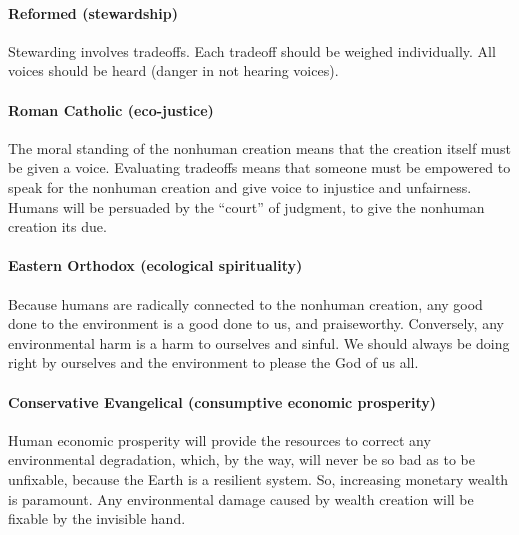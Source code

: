 \documentclass[12pt]{article}
\begin{document}
\paragraph{Reformed (stewardship)} 

Stewarding involves tradeoffs.  %
Each tradeoff should be weighed individually. %
All voices should be heard (danger in not hearing voices). %

\paragraph{Roman Catholic (eco-justice)} 

The moral standing of the nonhuman creation means that 
the creation itself must be given a voice. 
Evaluating tradeoffs means that someone must be empowered 
to speak for the nonhuman creation and 
give voice to injustice and unfairness. 
Humans will be persuaded by the “court” of judgment, 
to give the nonhuman creation its due.

\paragraph{Eastern Orthodox (ecological spirituality)} 

Because humans are radically connected to the nonhuman creation, 
any good done to the environment is a good done to us, 
and praiseworthy. 
Conversely, any environmental harm is a harm to ourselves and sinful. 
We should always be doing right by ourselves and the environment 
to please the God of us all.

\paragraph{Conservative Evangelical (consumptive economic prosperity)} 

Human economic prosperity will provide the resources 
to correct any environmental degradation, which, 
by the way, will never be so bad as to be unfixable, 
because the Earth is a resilient system. 
So, increasing monetary wealth is paramount. 
Any environmental damage caused by wealth creation will be fixable by the invisible hand. 
\end{document}
